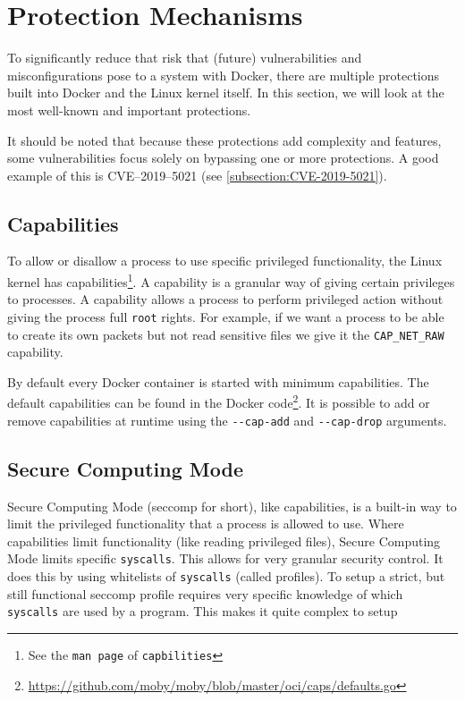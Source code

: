 \section{Protection Mechanisms}

To significantly reduce that risk that (future) vulnerabilities and misconfigurations pose to a system with Docker, there are multiple protections built into Docker and the Linux kernel itself. In this section, we will look at the most well-known and important protections.

\hfill

It should be noted that because these protections add complexity and features, some vulnerabilities focus solely on bypassing one or more protections. A good example of this is CVE--2019--5021 (see \autoref{subsection:CVE-2019-5021}).

\subsection{Capabilities}\label{protection-mechanisms:subsection:capabilities}
To allow or disallow a process to use specific privileged functionality, the Linux kernel has capabilities\footnote{See the \lstinline{man page} of \lstinline{capbilities}}. A capability is a granular way of giving certain privileges to processes. A capability allows a process to perform privileged action without giving the process full \lstinline{root} rights. For example, if we want a process to be able to create its own packets but not read sensitive files we give it the \lstinline{CAP_NET_RAW} capability.

\hfill

By default every Docker container is started with minimum capabilities. The default capabilities can be found in the Docker code\footnote{\url{https://github.com/moby/moby/blob/master/oci/caps/defaults.go}}. It is possible to add or remove capabilities at runtime using the \lstinline{--cap-add} and \lstinline{--cap-drop}\cite{More-Secure-Non-Root-Container} arguments.

\subsection{Secure Computing Mode}
Secure Computing Mode (seccomp for short), like capabilities, is a built-in way to limit the privileged functionality that a process is allowed to use. Where capabilities limit functionality (like reading privileged files), Secure Computing Mode limits specific \lstinline{syscalls}. This allows for very granular security control. It does this by using whitelists of \lstinline{syscalls} (called profiles).
To setup a strict, but still functional seccomp profile requires very specific knowledge of which \lstinline{syscalls} are used by a program. This makes it quite complex to setup

